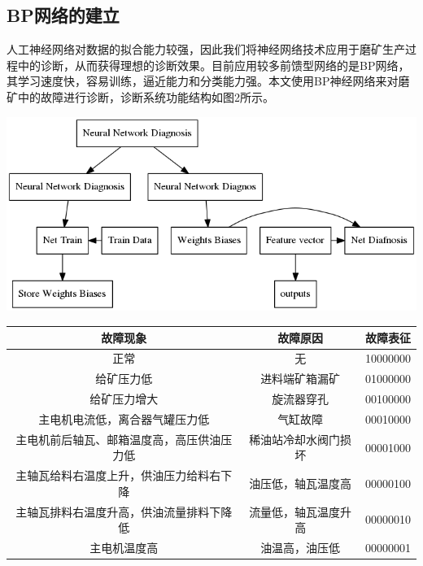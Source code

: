 \documentclass{ctacn}%
\begin{document}
\begin{multicols}{2}
\subsection{BP网络的建立}

人工神经网络对数据的拟合能力较强，因此我们将神经网络技术应用于磨矿生产过程中的诊断，从而获得理想的诊断效果。目前应用较多前馈型网络的是BP网络，其学习速度快，容易训练，逼近能力和分类能力强。本文使用BP神经网络来对磨矿中的故障进行诊断，诊断系统功能结构如图2所示。

\begin{center}
	\includegraphics[scale=0.12, trim=0 0 0 0]{figs/procedure}
	\label{fig2}
\end{center}
\end{multicols}
\begin{center}
	\renewcommand\tabcolsep{12.6pt}%
	\label{tab1}
	\renewcommand\tabcolsep{10pt}
	\begin{tabular}{ccc}\toprule
	故障现象&故障原因&故障表征\\
	\hline
	正常&无&10000000\\
	给矿压力低&进料端矿箱漏矿&01000000\\
	给矿压力增大&旋流器穿孔&00100000\\
	主电机电流低，离合器气罐压力低&气缸故障&00010000\\
	主电机前后轴瓦、邮箱温度高，高压供油压力低&稀油站冷却水阀门损坏&00001000\\
	主轴瓦给料右温度上升，供油压力给料右下降&油压低，轴瓦温度高&00000100\\
	主轴瓦排料右温度升高，供油流量排料下降低&流量低，轴瓦温度升高&00000010\\
	主电机温度高&油温高，油压低&00000001\\
	\bottomrule
	\end{tabular}
\end{center}
\end{document}
